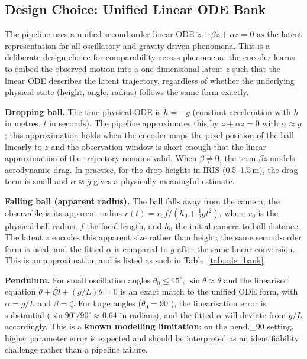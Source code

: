 \documentclass[runningheads]{llncs}
\begin{document}
\subsection{Design Choice: Unified Linear ODE Bank}
\label{app:ode_design}

The pipeline uses a unified second-order linear ODE
$\ddot{z} + \beta\dot{z} + \alpha z = 0$
as the latent representation for all oscillatory and gravity-driven
phenomena. This is a deliberate design choice for comparability across
phenomena: the encoder learns to embed the observed motion into a
one-dimensional latent $z$ such that the linear ODE describes the
latent trajectory, regardless of whether the underlying physical state
(height, angle, radius) follows the same form exactly.

\textbf{Dropping ball.} The true physical ODE is $\ddot{h} = -g$ (constant
acceleration with $h$ in metres, $t$ in seconds). The pipeline approximates
this by $\ddot{z} + \alpha z = 0$ with $\alpha \approx g$; this approximation
holds when the encoder maps the pixel position of the ball linearly to $z$
and the observation window is short enough that the linear approximation of
the trajectory remains valid. When $\beta \neq 0$, the term $\beta\dot{z}$
models aerodynamic drag.  In practice, for the drop heights in IRIS
(0.5--1.5\,m), the drag term is small and $\alpha \approx g$ gives a
physically meaningful estimate.

\textbf{Falling ball (apparent radius).} The ball falls away from the camera;
the observable is its apparent radius $r(t) = r_0 f/(h_0 + \tfrac{1}{2}g t^2)$,
where $r_0$ is the physical ball radius, $f$ the focal length, and $h_0$ the
initial camera-to-ball distance. The latent $z$ encodes this apparent size
rather than height; the same second-order form is used, and the fitted $\alpha$
is compared to $g$ after the same linear conversion. This is an approximation
and is listed as such in Table~\ref{tab:ode_bank}.

\textbf{Pendulum.} For small oscillation angles $\theta_0 \leq 45^\circ$,
$\sin\theta \approx \theta$ and the linearised equation
$\ddot{\theta} + \zeta\dot{\theta} + (g/L)\theta = 0$ is an exact match
to the unified ODE form, with $\alpha = g/L$ and $\beta = \zeta$.
For large angles ($\theta_0 = 90^\circ$), the linearisation error is
substantial ($\sin 90^\circ / 90^\circ \approx 0.64$ in radians), and
the fitted $\alpha$ will deviate from $g/L$ accordingly. This is a
\textbf{known modelling limitation}: on the pend.\_90 setting, higher
parameter error is expected and should be interpreted as an identifiability
challenge rather than a pipeline failure.
\end{document}
